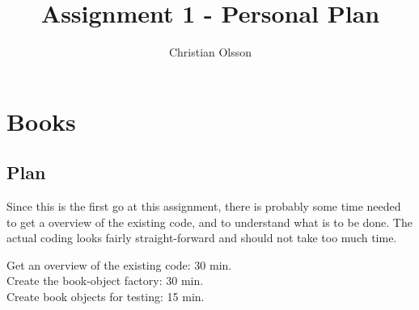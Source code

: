 \documentclass[fleqn,a4paper,11pt]{article}
\title{Assignment 1 - Personal Plan}
\author{Christian Olsson}
\begin{document}
\maketitle                      %

\thispagestyle{empty}           %

\newpage                        %

\section{Books}
\subsection{Plan}
Since this is the first go at this assignment, there is probably some time needed to
get a overview of the existing code, and to understand what is to be done. The actual coding looks fairly straight-forward and should not take too much time. 

Get an overview of the existing code: 30 min.\\
Create the book-object factory: 30 min.\\
Create book objects for testing: 15 min.
\end{document}
